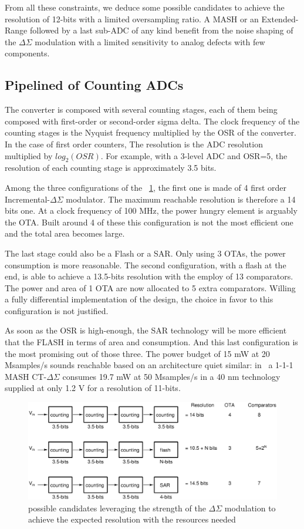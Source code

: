 From all these constraints, we deduce some possible candidates to achieve the resolution of 12-bits with a limited oversampling ratio.
A MASH or an Extended-Range followed by a last sub-ADC of any kind benefit from the noise shaping of the $\Delta\Sigma$ modulation with a limited sensitivity to analog defects with few components.

\subsection{Pipelined of Counting ADCs}
The converter is composed with several counting stages, each of them being composed with first-order or second-order sigma delta. The clock frequency of the
counting stages is the Nyquist frequency multiplied by the OSR of the converter. In the case of first order counters, The resolution is the ADC resolution multiplied by \(log_2(OSR)\). For example, with a 3-level ADC and OSR=5, the resolution of each counting stage is approximately 3.5 bits.

Among the three configurations of the \figurename~\ref{fig:counting-candidates}, the first one is made of 4 first order Incremental-\(\Delta \Sigma\) modulator. The maximum reachable resolution is therefore a 14 bits one. At a clock frequency of 100 MHz, the power hungry element is arguably the OTA\@. Built around 4 of these this configuration is not the most efficient one and the total area becomes large.

The last stage could also be a Flash or a SAR\@. Only using 3 OTAs, the power consumption is more reasonable. The second configuration, with a flash at the end, is able to achieve a 13.5-bits resolution with the employ of 13 comparators. The power and area of 1 OTA are now allocated to 5 extra comparators. Willing a fully differential implementation of the design, the choice in favor to this configuration is not justified.

As soon as the OSR is high-enough, the SAR technology will be more efficient that the FLASH in terms of area and consumption. And this last configuration is the most promising out of those three. The power budget of 15 mW at 20 Msamples/s sounds reachable based on an architecture quiet similar: in~\cite{Liu2017} a 1-1-1 MASH CT-\(\Delta\Sigma\) consumes 19.7 mW at 50 Msamples/s in a 40 nm technology supplied at only 1.2 V for a resolution of 11-bits.

\begin{figure}[htp]
	\centering
	\includegraphics[width=.9\textwidth]{Chapter4/Figs/study/counting-conversion.ps}
	\caption{possible candidates leveraging the strength of the \(\Delta \Sigma\) modulation to achieve the expected resolution with the resources needed}
	\label{fig:counting-candidates}
\end{figure}


